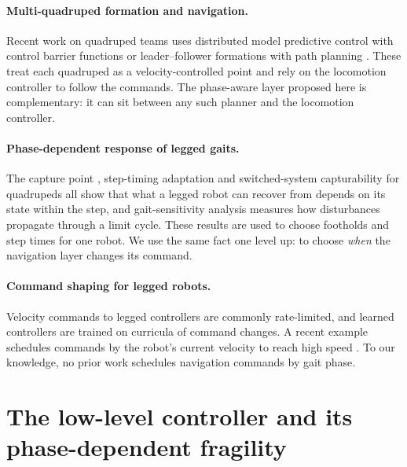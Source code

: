 \paragraph{Multi-quadruped formation and navigation.} Recent work on quadruped teams uses distributed model
predictive control with control barrier functions \cite{zhan2025safe} or leader--follower formations with
path planning \cite{noren2026role}. These treat each quadruped as a velocity-controlled point and rely on
the locomotion controller to follow the commands. The phase-aware layer proposed here is complementary: it
can sit between any such planner and the locomotion controller.

\paragraph{Phase-dependent response of legged gaits.} The capture point \cite{pratt2006capture}, step-timing
adaptation \cite{khadiv2016step} and switched-system capturability for quadrupeds
\cite{chen2022capturability} all show that what a legged robot can recover from depends on its state
within the step, and gait-sensitivity analysis \cite{hobbelen2007gsn} measures how disturbances propagate
through a limit cycle. These results are used to choose footholds and step times for one robot. We use the
same fact one level up: to choose \emph{when} the navigation layer changes its command.

\paragraph{Command shaping for legged robots.} Velocity commands to legged controllers are commonly
rate-limited, and learned controllers are trained on curricula of command changes. A recent example
schedules commands by the robot's current velocity to reach high speed \cite{tao2026speed}. To our
knowledge, no prior work schedules navigation commands by gait phase.

\section{The low-level controller and its phase-dependent fragility}\label{sec:controller}

